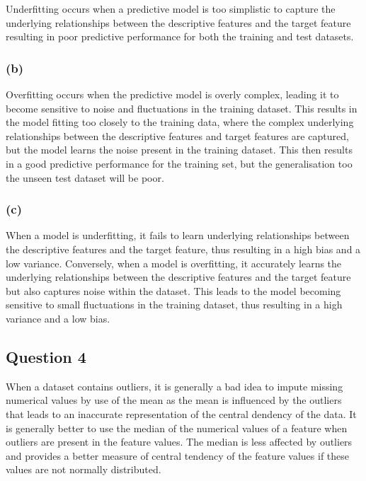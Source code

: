 \documentclass[10pt]{article}
\begin{document}
Underfitting occurs when a predictive model is too simplistic to capture the underlying
relationships between the descriptive features and the target feature resulting in poor predictive performance
for both the training and test datasets.

\subsubsection*{(b)}

Overfitting occurs when the predictive model is overly complex, leading it to become sensitive to noise
and fluctuations in the training dataset. This results in the model fitting too closely to the training data,
where the complex underlying relationships between the descriptive features and target features are captured,
but the model learns the noise present in the training dataset. This then results in a good predictive
performance for the training set, but the generalisation too the unseen test dataset will be poor.

\subsubsection*{(c)}

When a model is underfitting, it fails to learn underlying relationships between the descriptive
features and the target feature, thus resulting in a high bias and a low variance. Conversely, when a model is
overfitting, it accurately learns the underlying relationships between the descriptive
features and the target feature but also captures noise within the dataset. This leads to the model becoming sensitive
to small fluctuations in the training dataset, thus resulting in a high variance and a low bias.

\subsection*{Question 4}

When a dataset contains outliers, it is generally a bad idea to impute missing numerical values by use of the mean
as the mean is influenced by the outliers that leads to an inaccurate representation of the central dendency of the data.
It is generally better to use the median of the numerical values of a feature when outliers are present in the feature values.
The median is less affected by outliers and provides a better measure of central tendency of the feature values if these values are
not normally distributed.
\end{document}
